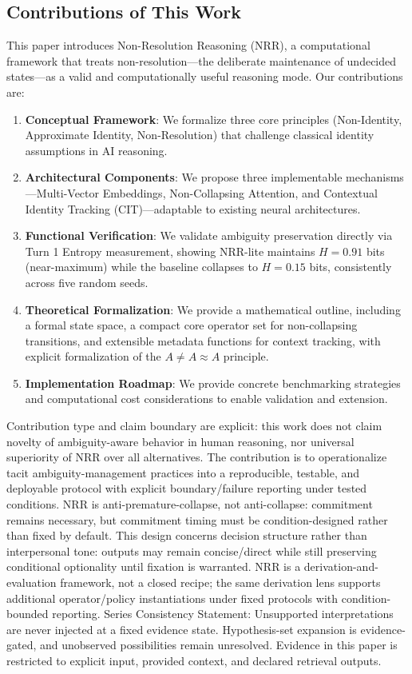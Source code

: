 \documentclass[11pt,a4paper]{article}
\newcommand{\AneqAapproxA}{A \neq A \approx A}
\begin{document}
\subsection{Contributions of This Work}

This paper introduces Non-Resolution Reasoning (NRR), a computational framework that treats non-resolution---the deliberate maintenance of undecided states---as a valid and computationally useful reasoning mode.
Our contributions are:

\begin{enumerate}
\item \textbf{Conceptual Framework}: We formalize three core principles (Non-Identity, Approximate Identity, Non-Resolution) that challenge classical identity assumptions in AI reasoning.
\item \textbf{Architectural Components}: We propose three implementable mechanisms---Multi-Vector Embeddings, Non-Collapsing Attention, and Contextual Identity Tracking (CIT)---adaptable to existing neural architectures.
\item \textbf{Functional Verification}: We validate ambiguity preservation directly via Turn 1 Entropy measurement, showing NRR-lite maintains $H = 0.91$ bits (near-maximum) while the baseline collapses to $H = 0.15$ bits, consistently across five random seeds.
\item \textbf{Theoretical Formalization}: We provide a mathematical outline, including a formal state space, a compact core operator set for non-collapsing transitions, and extensible metadata functions for context tracking, with explicit formalization of the $\AneqAapproxA$ principle.
\item \textbf{Implementation Roadmap}: We provide concrete benchmarking strategies and computational cost considerations to enable validation and extension.
\end{enumerate}

Contribution type and claim boundary are explicit: this work does not claim novelty of ambiguity-aware behavior in human reasoning, nor universal superiority of NRR over all alternatives. The contribution is to operationalize tacit ambiguity-management practices into a reproducible, testable, and deployable protocol with explicit boundary/failure reporting under tested conditions.
NRR is anti-premature-collapse, not anti-collapse: commitment remains necessary, but commitment timing must be condition-designed rather than fixed by default.
This design concerns decision structure rather than interpersonal tone: outputs may remain concise/direct while still preserving conditional optionality until fixation is warranted.
NRR is a derivation-and-evaluation framework, not a closed recipe; the same derivation lens supports additional operator/policy instantiations under fixed protocols with condition-bounded reporting.
Series Consistency Statement: Unsupported interpretations are never injected at a fixed evidence state. Hypothesis-set expansion is evidence-gated, and unobserved possibilities remain unresolved. Evidence in this paper is restricted to explicit input, provided context, and declared retrieval outputs.
\end{document}
